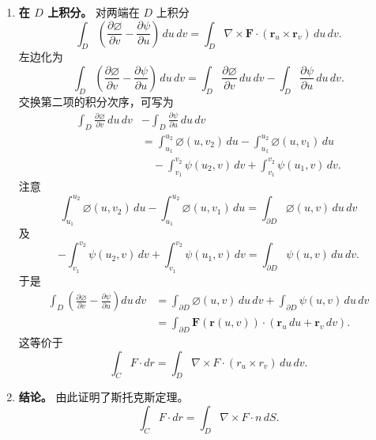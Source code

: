 \begin{enumerate}
\begin{enumerate}[label=\alph*.]
\[
  \frac{\partial\varnothing}{\partial v}
  =\frac{\partial}{\partial v}(\symbf{F}\cdot\symbf{r}_u)
  =\symbf{F}_v\cdot\symbf{r}_u+\symbf{F}\cdot\symbf{r}_{uv}.
\]
类似地，定义 $\psi(u,v)=\symbf{F}(\symbf{r}(u,v))\cdot\symbf{r}_v(u,v)$，计算 $\dfrac{\partial\psi}{\partial u}$
\[
  \frac{\partial\psi}{\partial u}
  =\symbf{F}_u\cdot\symbf{r}_v+\symbf{F}\cdot\symbf{r}_{vu}.
\]
两导数相减，得到
\[
  \frac{\partial\varnothing}{\partial v}-\frac{\partial\psi}{\partial u}
  =\nabla\times\symbf{F}\cdot(\symbf{r}_u\times\symbf{r}_v).
\]
\item \textbf{在 $D$ 上积分。}
对两端在 $D$ 上积分
\[
  \int_D\left(\frac{\partial\varnothing}{\partial v}-\frac{\partial\psi}{\partial u}\right)\,du\,dv
  =\int_D\nabla\times\symbf{F}\cdot(\symbf{r}_u\times\symbf{r}_v)\,du\,dv.
\]
左边化为
\[
  \int_D\left(\frac{\partial\varnothing}{\partial v}-\frac{\partial\psi}{\partial u}\right)\,du\,dv
  =\int_D\frac{\partial\varnothing}{\partial v}\,du\,dv
  -\int_D\frac{\partial\psi}{\partial u}\,du\,dv.
\]
交换第二项的积分次序，可写为
\begin{align*}
  \int_D\frac{\partial\varnothing}{\partial v}\,du\,dv
     &-\int_D\frac{\partial\psi}{\partial u}\,du\,dv\\
     &=\int_{u_1}^{u_2}\varnothing(u,v_2)\,du-\int_{u_1}^{u_2}\varnothing(u,v_1)\,du\\
     &\quad-\int_{v_1}^{v_2}\psi(u_2,v)\,dv+\int_{v_1}^{v_2}\psi(u_1,v)\,dv.
\end{align*}
注意%
%
\[
  \int_{u_1}^{u_2}\varnothing(u,v_2)\,du-\int_{u_1}^{u_2}\varnothing(u,v_1)\,du
   =\int_{\partial D}\varnothing(u,v)\,du\,dv
\]
及
\[
  -\int_{v_1}^{v_2}\psi(u_2,v)\,dv+\int_{v_1}^{v_2}\psi(u_1,v)\,dv
    =\int_{\partial D}\psi(u,v)\,du\,dv.
\]
于是
\begin{align*}
  \int_D\left(\frac{\partial\varnothing}{\partial v}
       -\frac{\partial\psi}{\partial u}\right)du\,dv
   &=\int_{\partial D}\varnothing(u,v)\,du\,dv
     +\int_{\partial D}\psi(u,v)\,du\,dv\\
   &=\int_{\partial D}\symbf{F}(\symbf{r}(u,v))\cdot(\symbf{r}_u\,du+\symbf{r}_v\,dv).
\end{align*}
这等价于
\[
  \int_C F\cdot dr=\int_D\nabla\times F\cdot(r_u\times r_v)\,du\,dv.
\]
\item \textbf{结论。}
由此证明了斯托克斯定理。%
%
\[
  \int_C F\cdot dr=\int_D\nabla\times F\cdot n\,dS.
\]
\end{enumerate}
\end{enumerate}

